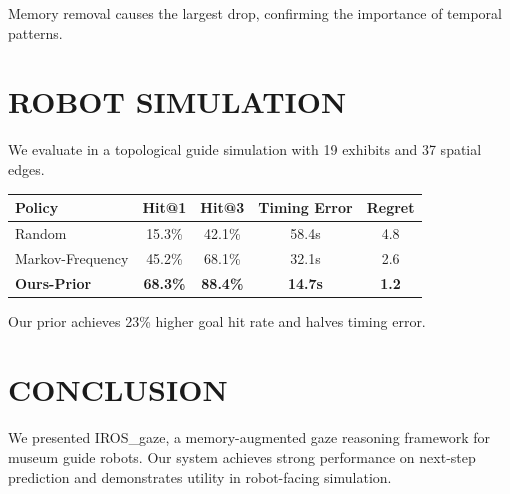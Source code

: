 \documentclass{article}
\begin{document}
Memory removal causes the largest drop, confirming the importance of temporal patterns.

\section{ROBOT SIMULATION}

We evaluate in a topological guide simulation with 19 exhibits and 37 spatial edges.

\begin{center}
\begin{tabular}{lcccc}
\hline
Policy & Hit@1 & Hit@3 & Timing Error & Regret \\
\hline
Random & 15.3\% & 42.1\% & 58.4s & 4.8 \\
Markov-Frequency & 45.2\% & 68.1\% & 32.1s & 2.6 \\
\textbf{Ours-Prior} & \textbf{68.3\%} & \textbf{88.4\%} & \textbf{14.7s} & \textbf{1.2} \\
\hline
\end{tabular}
\end{center}

Our prior achieves 23\% higher goal hit rate and halves timing error.

\section{CONCLUSION}

We presented IROS\_gaze, a memory-augmented gaze reasoning framework for museum guide robots. Our system achieves strong performance on next-step prediction and demonstrates utility in robot-facing simulation.
\end{document}

